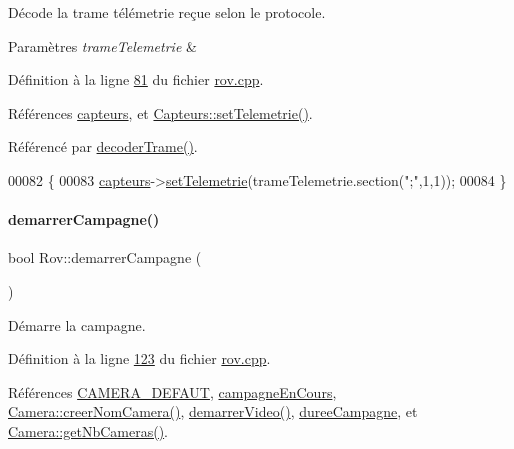 Décode la trame télémetrie reçue selon le protocole. 


\begin{DoxyParams}{Paramètres}
{\em trame\+Telemetrie} & \\
\hline
\end{DoxyParams}


Définition à la ligne \hyperlink{rov_8cpp_source_l00081}{81} du fichier \hyperlink{rov_8cpp_source}{rov.\+cpp}.



Références \hyperlink{rov_8h_source_l00095}{capteurs}, et \hyperlink{capteurs_8cpp_source_l00019}{Capteurs\+::set\+Telemetrie()}.



Référencé par \hyperlink{rov_8cpp_source_l00180}{decoder\+Trame()}.


\begin{DoxyCode}
00082 \{
00083     \hyperlink{class_rov_a1b34d63d505da660be27b75ad93754c3}{capteurs}->\hyperlink{class_capteurs_a399af986afb9d707138bc57a51e1f34f}{setTelemetrie}(trameTelemetrie.section(\textcolor{stringliteral}{";"},1,1));
00084 \}
\end{DoxyCode}
\mbox{\label{class_rov_ab20c6d0a73d6b20d4bef9e9236535a3d}} 
\paragraph{\texorpdfstring{demarrer\+Campagne()}{demarrerCampagne()}}
{\footnotesize\ttfamily bool Rov\+::demarrer\+Campagne (\begin{DoxyParamCaption}{ }\end{DoxyParamCaption})}



Démarre la campagne. 



Définition à la ligne \hyperlink{rov_8cpp_source_l00123}{123} du fichier \hyperlink{rov_8cpp_source}{rov.\+cpp}.



Références \hyperlink{camera_8h_source_l00029}{C\+A\+M\+E\+R\+A\+\_\+\+D\+E\+F\+A\+UT}, \hyperlink{rov_8h_source_l00110}{campagne\+En\+Cours}, \hyperlink{camera_8cpp_source_l00293}{Camera\+::creer\+Nom\+Camera()}, \hyperlink{rov_8cpp_source_l00161}{demarrer\+Video()}, \hyperlink{rov_8h_source_l00109}{duree\+Campagne}, et \hyperlink{camera_8cpp_source_l00270}{Camera\+::get\+Nb\+Cameras()}.



